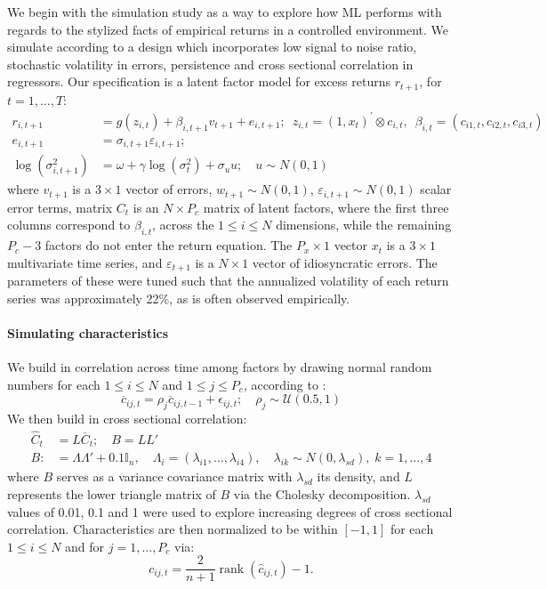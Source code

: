\documentclass{article}
\begin{document}
We begin with the simulation study as a way to explore how ML performs with regards to the stylized facts of empirical returns in a controlled environment. We simulate according to a design which incorporates low signal to noise ratio, stochastic volatility in errors, persistence and cross sectional correlation in regressors. Our specification is a latent factor model for excess returns $r_{t+1}$, for $t=1, \dots, T$:
\begin{align}
r_{i, t+1} &= 
g\left(z_{i, t}\right) + \beta_{i,t+1}v_{t+1} + e_{i, t+1}; 
\enspace z_{i, t} = \left(1, x_{t}\right)^{\prime} \otimes c_{i, t}, 
\enspace \beta_{i, t} = \left(c_{i 1, t}, c_{i 2, t}, c_{i 3, t}\right) \\ 
e_{i, t+1} &= 
\sigma_{i, t+1} \varepsilon_{i, t+1}; \\
\operatorname{log} (\sigma^2_{i,t+1}) &= 
\omega + \gamma \operatorname{log} (\sigma^2_{t}) + \sigma_{u}u;
\quad u \sim N(0, 1)
\end{align}
where $v_{t+1}$ is a $3\times 1$ vector of errors, $w_{t+1} \sim N(0, 1)$,  $\varepsilon_{i,t+1} \sim N(0, 1)$ scalar error terms, matrix $C_t$ is an $N\times P_c$ matrix of latent factors, where the first three columns correspond to $\beta_{i,t}$, across the $1\leq i\leq N$ dimensions, while the remaining $P_c-3$ factors do not enter the return equation. The $P_x\times1$ vector $x_t$ is a $3 \times 1$ multivariate time series, and $\varepsilon_{t+1}$ is a $N\times 1$ vector of idiosyncratic errors. The parameters of these were tuned such that the annualized volatility of each return series was approximately 22\%, as is often observed empirically.
\paragraph{Simulating characteristics}
We build in correlation across time among factors by drawing normal random numbers for each $1\leq i\leq N$ and $1\leq j\leq P_{c}$, according to :
\begin{equation}
\overline{c}_{i j, t} = \rho_{j} \overline{c}_{i j, t-1}+\epsilon_{i j, t} ;
\quad \rho_{j} \sim \mathcal{U} \left( 0.5, 1 \right) 
\end{equation}
We then build in cross sectional correlation:
\begin{align}
\widehat{C}_{t}&=L\overline{C}_{t} ; \quad B = LL' \\
B:&=\Lambda\Lambda' + 0.1\mathbb{I}_{n}, \quad
\Lambda_i = (\lambda_{i1}, \dots, \lambda_{i4}), \quad
\lambda_{ik}\sim N(0, \lambda_{sd}), \; k=1, \dots, 4
\end{align}
where $B$ serves as a variance covariance matrix with $\lambda_{sd}$ its density, and $L$ represents the lower triangle matrix of $B$ via the Cholesky decomposition. $\lambda_{sd}$ values of 0.01, 0.1 and 1 were used to explore increasing degrees of cross sectional correlation.
Characteristics are then normalized to be within $[-1, 1]$ for each $1\leq i\leq N$ and for $j=1, \dots, P_{c}$ via:
\begin{equation}
c_{i j, t} = \frac{2}{n+1} \operatorname{rank}\left(\hat{c}_{i j, t}\right) - 1.
\end{equation}
\end{document}
